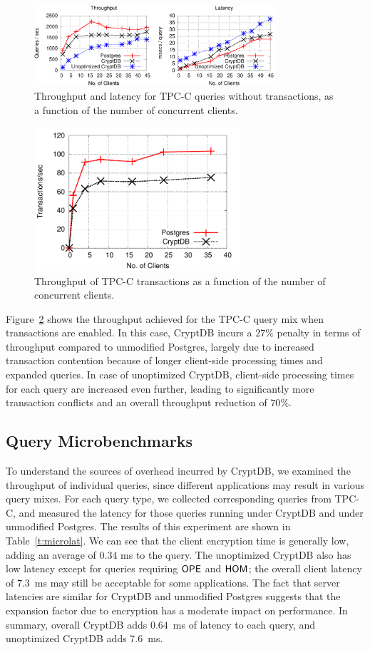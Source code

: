 \begin{figure}[t!]
\centering
\includegraphics[width=3.5in]{fig/queries.pdf}
\caption{Throughput and latency for TPC-C queries without transactions,
    as a function of the number of concurrent clients.}
\label{fig:querytputlat}
\end{figure}

\begin{figure}[t!] 
\centering
\includegraphics[width=3in]{fig/trantput.pdf} 
\caption{Throughput of TPC-C transactions as a function of
	 the number of concurrent clients.}
\label{fig:trantput}
\end{figure}


Figure~\ref{fig:trantput} shows the throughput achieved for the
TPC-C query mix when transactions are enabled.  In this case,
CryptDB incurs a $27\%$ penalty in terms of throughput compared
to unmodified Postgres, largely due to increased transaction
contention because of longer client-side processing times and
expanded queries.  In case of unoptimized CryptDB, client-side
processing times for each query are increased even further,
leading to significantly more transaction conflicts and an
overall throughput reduction of $70\%$.


\subsection{Query Microbenchmarks}

To understand the sources of overhead incurred by CryptDB, we
examined the throughput of individual queries, since different
applications may result in various query mixes. 
For each query type, we collected corresponding queries from TPC-C,
and measured the latency for those queries running
under CryptDB and under unmodified Postgres.
The results of this experiment are shown in Table~\ref{t:microlat}.
We can see that the client encryption time is generally low, adding
an average of $0.34$ ms to the query.  The unoptimized CryptDB also
has low latency except for queries requiring $\mathsf{OPE}$ and $\mathsf{HOM}$; the
overall client latency of $7.3$~ms may still be acceptable for some
applications.  The fact that server latencies are similar for CryptDB
and unmodified Postgres suggests that the expansion factor due to
encryption has a moderate impact on performance.
In summary, overall CryptDB adds $0.64$~ms of latency to each query,
and unoptimized CryptDB adds $7.6$~ms.

